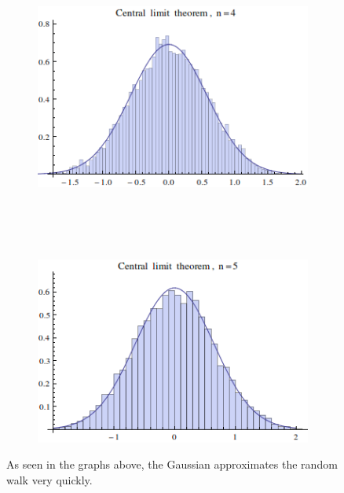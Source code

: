 \documentclass[12pt]{article}
\begin{document}
\begin{figure}[!htb]
\begin{subfigure}[b]{0.4\textwidth}
\includegraphics[scale=0.4]{central4}
\end{subfigure}
\\~\\~
\begin{subfigure}[b]{0.4\textwidth}
\includegraphics[scale=0.5]{central5}
\end{subfigure}
\caption{As seen in the graphs above, the Gaussian approximates the random walk very quickly.}
\end{figure}
\end{document}
